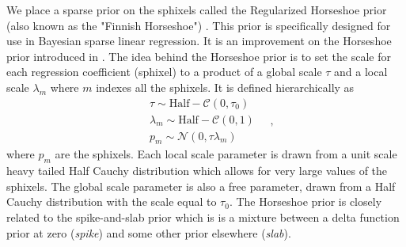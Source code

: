 \documentclass[modern]{aastex62}
\begin{document}
We place a sparse prior on the sphixels called the Regularized Horseshoe prior (also known as the "Finnish Horseshoe") \citep{piironen2017}. 
This prior is specifically designed for use in Bayesian sparse linear regression. 
It is an improvement on the Horseshoe prior introduced in \cite{carvalho2010}.
The idea behind the Horseshoe prior is to set the scale for each regression coefficient (sphixel) to a product of a global scale $\tau$ and a local scale $\lambda_m$ where $m$ indexes all the sphixels.
It is defined hierarchically as 
\begin{equation}
\begin{aligned}
    &\tau  \sim \mathrm{Half}-\mathcal{C} \left(0, \tau_{0}\right)\\
    &\lambda_{m}  \sim \mathrm{Half}-\mathcal{C} (0,1) \\
    &p_{m}  \sim \mathcal{N}\left(0, \tau \lambda_{m}\right) 
\end{aligned}
    \quad,
    \label{eq:horseshoe}
\end{equation}
where $p_m$ are the sphixels.
Each local scale parameter is drawn from a unit scale heavy tailed Half Cauchy distribution which allows for very large values of the sphixels.
The global scale parameter is also a free parameter, drawn from a Half Cauchy distribution with the scale equal to $\tau_0$.
The Horseshoe prior is closely related to the spike-and-slab prior which is is a mixture between a delta function prior at zero (\emph{spike}) and some other prior elsewhere (\emph{slab}).
\end{document}
